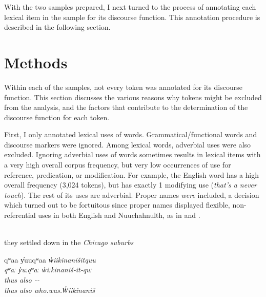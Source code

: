 With the two samples prepared, I next turned to the process of annotating each lexical item in the sample for its discourse function. This annotation procedure is described in the following section.

\section{Methods}
\label{sec:3.3}

Within each of the samples, not every token was annotated for its discourse function. This section discusses the various reasons why tokens might be excluded from the analysis, and the factors that contribute to the determination of the discourse function for each token.

First, I only annotated lexical uses of words. Grammatical/functional words and discourse markers were ignored. Among lexical words, adverbial uses were also excluded. Ignoring adverbial uses of words sometimes results in lexical items with a very high overall corpus frequency, but very low occurrences of use for reference, predication, or modification. For example, the English word  has a high overall frequency (3,024 tokens), but has exactly 1 modifying use (\textit{that's a \em{never} touch}). The rest of its uses are adverbial. Proper names \emph{were} included, a decision which turned out to be fortuitous since proper names displayed flexible, non-referential uses in both English and Nuuchahnulth, as in  and .

\begin{exe}

  \ex\label{ex:3.2}
  \\
  they settled down in the \em{Chicago} suburbs

  \ex\label{ex:3.3}
  \vfix
  \gllll qʷaa y̓uuqʷaa \em{w̓iikinanišitquu}\\
         qʷaː y̓uːqʷaː \em{w̓iːkinaniš‑it‑quː}\\
         thus also    \em{‑‑}\\
         thus also    \em{who.was.W̓iikinaniš}\\
         \vfix

\end{exe}

